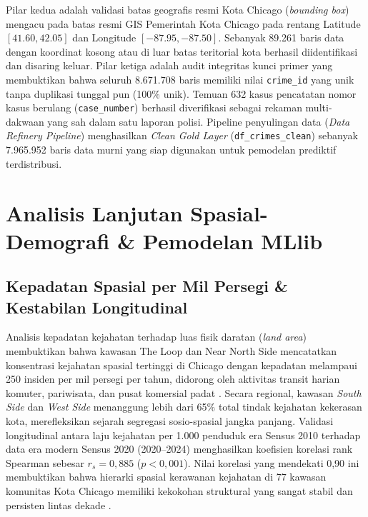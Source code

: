 \documentclass[11pt,a4paper]{article}
\begin{document}
Pilar kedua adalah validasi batas geografis resmi Kota Chicago (\textit{bounding box}) mengacu pada batas resmi GIS Pemerintah Kota Chicago pada rentang Latitude $[41.60, 42.05]$ dan Longitude $[-87.95, -87.50]$. Sebanyak 89.261 baris data dengan koordinat kosong atau di luar batas teritorial kota berhasil diidentifikasi dan disaring keluar. Pilar ketiga adalah audit integritas kunci primer yang membuktikan bahwa seluruh 8.671.708 baris memiliki nilai \texttt{crime\_id} yang unik tanpa duplikasi tunggal pun (100\% unik). Temuan 632 kasus pencatatan nomor kasus berulang (\texttt{case\_number}) berhasil diverifikasi sebagai rekaman multi-dakwaan yang sah dalam satu laporan polisi. Pipeline penyulingan data (\textit{Data Refinery Pipeline}) menghasilkan \textit{Clean Gold Layer} (\texttt{df\_crimes\_clean}) sebanyak 7.965.952 baris data murni yang siap digunakan untuk pemodelan prediktif terdistribusi.

\section{Analisis Lanjutan Spasial-Demografi \& Pemodelan MLlib}

\subsection{Kepadatan Spasial per Mil Persegi \& Kestabilan Longitudinal}
Analisis kepadatan kejahatan terhadap luas fisik daratan (\textit{land area}) membuktikan bahwa kawasan The Loop dan Near North Side mencatatkan konsentrasi kejahatan spasial tertinggi di Chicago dengan kepadatan melampaui 250 insiden per mil persegi per tahun, didorong oleh aktivitas transit harian komuter, pariwisata, dan pusat komersial padat \cite{stec2018}. Secara regional, kawasan \textit{South Side} dan \textit{West Side} menanggung lebih dari 65\% total tindak kejahatan kekerasan kota, merefleksikan sejarah segregasi sosio-spasial jangka panjang. Validasi longitudinal antara laju kejahatan per 1.000 penduduk era Sensus 2010 terhadap data era modern Sensus 2020 (2020--2024) menghasilkan koefisien korelasi rank Spearman sebesar $r_s = 0,885$ ($p < 0,001$). Nilai korelasi yang mendekati 0,90 ini membuktikan bahwa hierarki spasial kerawanan kejahatan di 77 kawasan komunitas Kota Chicago memiliki kekokohan struktural yang sangat stabil dan persisten lintas dekade \cite{campedelli2020}.
\end{document}

